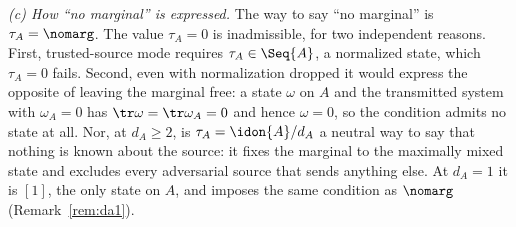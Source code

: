\begin{remark}
\emph{(c) How ``no marginal'' is expressed.} The way to say ``no marginal''
is $\tau_A=\nomarg$. The value $\tau_A=0$ is inadmissible, for two
independent reasons. First, trusted-source mode requires
$\tau_A\in\Seq{A}$, a normalized state, which $\tau_A=0$ fails. Second,
even with normalization dropped it would express the opposite of leaving
the marginal free: a state $\omega$ on $A$ and the transmitted system with
$\omega_A=0$ has $\tr\omega=\tr\omega_A=0$ and hence $\omega=0$, so the
condition admits no state at all. Nor, at $d_A\ge2$, is
$\tau_A=\idon{A}/d_A$ a neutral way to say that nothing is known about the
source: it fixes the marginal to the maximally mixed state and excludes
every adversarial source that sends anything else. At $d_A=1$ it is $[1]$,
the only state on $A$, and imposes the same condition as $\nomarg$
(Remark~\ref{rem:da1}).
\end{remark}

